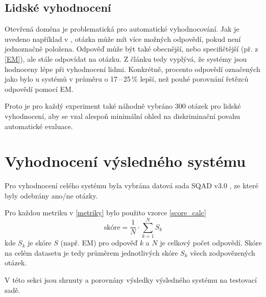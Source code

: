 \subsection{Lidské vyhodnocení}
Otevřená doména je problematická pro automatické vyhodnocování. Jak je uvedeno například v \cite{min2021neurips}, otázka může mít více možných odpovědí, pokud není jednoznačně položena. Odpověď může být také obecnější, nebo specifičtější (př. z \ref{EM}), ale stále odpovídat na otázku. Z článku \cite{min2021neurips} tedy vyplývá, že systémy jsou hodnoceny lépe při vyhodnocení lidmi. Konkrétně, procento odpovědí označených jako  bylo u systémů v průměru o 17\,--\,25\,\% lepší, než pouhé porovnání řetězců odpovědí pomocí EM.\par
Proto je pro každý experiment také náhodně vybráno 300 otázek pro lidské vyhodnocení, aby se vzal alespoň minimální ohled na diskriminační povahu automatické evaluace.

\section{Vyhodnocení výsledného systému}
Pro vyhodnocení celého systému byla vybrána datová sada SQAD v3.0 \cite{sqad}, ze které byly odebrány ano/ne otázky.\par
Pro každou metriku v \ref{metriky} bylo použito vzorce \ref{score_calc}
\begin{equation}
    \label{score_calc}
    \text{skóre} = \frac{1}{N}\cdot \sum^N_{k=1} S_k
\end{equation}
kde $S_k$ je skóre $S$ (např. EM) pro odpověď $k$ a $N$ je celkový počet odpovědí. Skóre na celém datasetu je tedy průměrem jednotlivých skóre $S_k$ všech zodpovězených otázek.\par
V této sekci jsou shrnuty a porovnány výsledky výsledného systému na testovací sadě.

